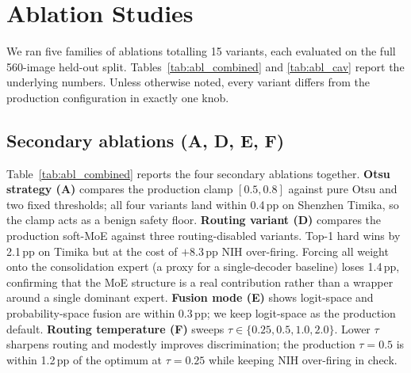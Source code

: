 \documentclass{article}
\begin{document}
\FloatBarrier
\section{Ablation Studies}
\label{sec:ablations}

We ran five families of ablations totalling 15 variants, each evaluated on the full 560-image held-out split. Tables~\ref{tab:abl_combined} and \ref{tab:abl_cav} report the underlying numbers. Unless otherwise noted, every variant differs from the production configuration in exactly one knob.

\subsection{Secondary ablations (A, D, E, F)}
\label{sec:abl_secondary}

Table~\ref{tab:abl_combined} reports the four secondary ablations together. \textbf{Otsu strategy (A)} compares the production clamp $[0.5, 0.8]$ against pure Otsu and two fixed thresholds; all four variants land within 0.4\,pp on Shenzhen Timika, so the clamp acts as a benign safety floor. \textbf{Routing variant (D)} compares the production soft-MoE against three routing-disabled variants. Top-1 hard wins by 2.1\,pp on Timika but at the cost of $+8.3$\,pp NIH over-firing. Forcing all weight onto the consolidation expert (a proxy for a single-decoder baseline) loses 1.4\,pp, confirming that the MoE structure is a real contribution rather than a wrapper around a single dominant expert. \textbf{Fusion mode (E)} shows logit-space and probability-space fusion are within 0.3\,pp; we keep logit-space as the production default. \textbf{Routing temperature (F)} sweeps $\tau \in \{0.25, 0.5, 1.0, 2.0\}$. Lower $\tau$ sharpens routing and modestly improves discrimination; the production $\tau = 0.5$ is within 1.2\,pp of the optimum at $\tau = 0.25$ while keeping NIH over-firing in check.
\end{document}
